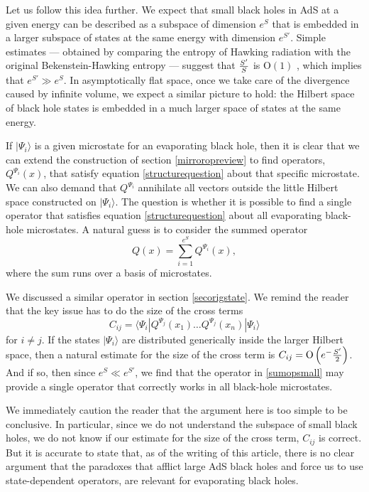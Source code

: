 \documentclass[12pt]{article}
\def\qop{Q}
\def\Or[#1]{{\text{O}}\left({#1}\right)}
\newcommand{\be}{\begin{equation}}
\newcommand{\ee}{\end{equation}}
\begin{document}
Let us follow this idea further. We expect that small black holes in AdS at a given energy can be described as a subspace of dimension $e^{S}$ that is embedded in a larger subspace of states at the same energy with dimension $e^{S'}$. Simple estimates --- obtained by comparing the entropy of Hawking radiation with the original Bekenstein-Hawking entropy --- suggest that ${S' \over S}$ is $\Or[1]$ \cite{Page:2013dx}, which implies that  $e^{S'} \gg e^{S}$. In asymptotically flat space, once we take care of the divergence caused by infinite volume, we expect a similar picture to hold: the Hilbert space of black hole states is embedded in a much larger space of states at the same energy.

If $|\Psi_i \rangle$ is a given microstate for an evaporating black hole,  then it is clear that we can extend the construction of section \ref{mirroropreview} to find operators, $\qop^{\Psi_i}(x)$,  that satisfy equation \eqref{structurequestion} about  that specific microstate. We can also demand that $\qop^{\Psi_i}$ annihilate all vectors outside the little Hilbert space constructed on $|\Psi_i \rangle$. The question is whether it is possible to find a single operator that satisfies equation \eqref{structurequestion} about all evaporating black-hole microstates. A natural guess is to consider the summed operator
\be
\label{sumopsmall}
\qop(x) = \sum_{i=1}^{e^{S}} \qop^{\Psi_i}(x),
\ee
where the sum runs over a basis of microstates.

We discussed a similar operator in section  \eqref{secorigstate}. We remind the reader that the key issue  has to do the size of the cross terms
\be
C_{i j} = \langle \Psi_i| \qop^{\Psi_j}(x_1) \ldots \qop^{\Psi_j}(x_n) |\Psi_i\rangle
\ee
for $i \neq j$. If the states $|\Psi_i \rangle$ are distributed generically inside the larger Hilbert space, then a natural estimate for the size of the cross term is $C_{i j} = \Or[e^{-{S' \over 2}}]$. And if so, then since $e^{S} \ll e^{S'}$, we find that the operator in \eqref{sumopsmall} may provide a single operator that correctly works in all black-hole microstates.












We immediately caution the reader that the argument here is too simple to be conclusive. In particular, since we do not understand the subspace of small black holes, we do not know if our estimate for the size of the cross term, $C_{i j}$ is correct. But it is accurate to state that, as of the writing of this article, there is no clear argument that the paradoxes that afflict large AdS black holes and force us to use state-dependent operators, are relevant for evaporating black holes.
\end{document}
